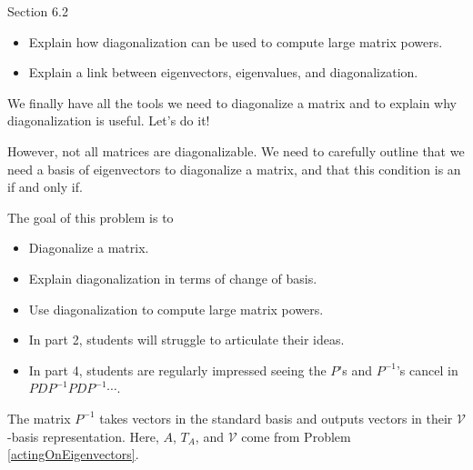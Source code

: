 \begin{lesson}

	Section 6.2

	\begin{itemize}
		\item Explain how diagonalization can be used to compute large matrix powers.
		\item Explain a link between eigenvectors, eigenvalues, and diagonalization.

	\end{itemize}

	We finally have all the tools we need to diagonalize a matrix and to explain why diagonalization is useful.
	Let's do it!

	However, not all matrices are diagonalizable. We need to carefully outline that we need a
	basis of eigenvectors to diagonalize a matrix, and that this condition is an if and only if.

\end{lesson}
	\bookonlynewpage
	\question
	\begin{annotation}
		\begin{goals}

			The goal of this problem is to
			\begin{itemize}
				\item Diagonalize a matrix.
				\item Explain diagonalization in terms of change of basis.
				\item Use diagonalization to compute large matrix powers.
			\end{itemize}
		\end{goals}

		\begin{notes}
			\begin{itemize}
				\item In part 2, students will struggle to articulate their ideas.
				\item In part 4, students are regularly impressed seeing the $P$'s and
					$P^{-1}$'s cancel in $PDP^{-1}PDP^{-1}\cdots$.
			\end{itemize}
		\end{notes}
	\end{annotation}
	The matrix $P^{-1}$ takes vectors in the standard basis and outputs
	vectors in their $\mathcal V$-basis representation. Here, $A$, $T_A$, and $\mathcal V$
	come from Problem \ref{actingOnEigenvectors}.
